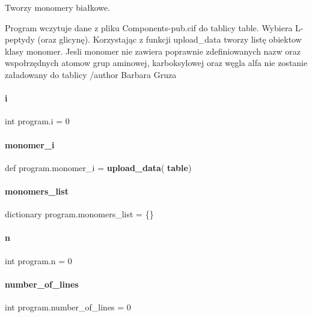 Tworzy monomery białkowe. 

Program wczytuje dane z pliku Components-\/pub.\+cif do tablicy \textquotesingle{}table\textquotesingle{}. Wybiera L-\/peptydy (oraz glicynę). Korzystając z funkcji \textquotesingle{}upload\+\_\+data\textquotesingle{} tworzy listę obiektow klasy monomer. Jesli monomer nie zawiera poprawnie zdefiniowanych nazw oraz wspołrzędnych atomow grup aminowej, karboksylowej oraz węgla alfa nie zostanie załadowany do tablicy /author Barbara Gruza \mbox{\label{namespaceprogram_ac317d4ad54c6a8161f773f78ed3706df}} 
\paragraph{i}
{\footnotesize\ttfamily int program.\+i = 0}

\mbox{\label{namespaceprogram_a282e8ffbb5b2791e00ca1d1923c4f889}} 
\paragraph{monomer\+\_\+i}
{\footnotesize\ttfamily def program.\+monomer\+\_\+i = \textbf{ upload\+\_\+data}(\textbf{ table})}

\mbox{\label{namespaceprogram_a5e61cf96fe09fa76b9a539537c55cfea}} 
\paragraph{monomers\+\_\+list}
{\footnotesize\ttfamily dictionary program.\+monomers\+\_\+list = \{\}}

\mbox{\label{namespaceprogram_abf45047966c69469c1b1ae16dddfd97f}} 
\paragraph{n}
{\footnotesize\ttfamily int program.\+n = 0}

\mbox{\label{namespaceprogram_ae6036ca9fde833c1c16f8f29f393b794}} 
\paragraph{number\+\_\+of\+\_\+lines}
{\footnotesize\ttfamily int program.\+number\+\_\+of\+\_\+lines = 0}

